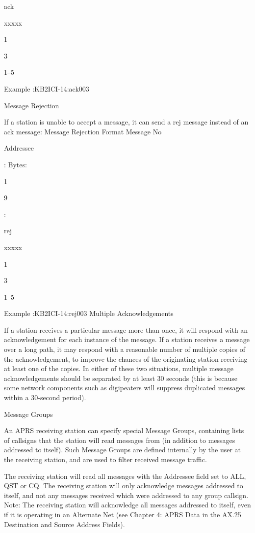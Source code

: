 {{{{ack

xxxxx

1

3

1–5

Example
:KB2ICI-14:ack003

Message Rejection

If a station is unable to accept a message, it can send a rej message instead
of an ack message:
Message Rejection Format
Message
No

Addressee

:
Bytes:

1

9

:

rej

xxxxx

1

3

1–5

Example
:KB2ICI-14:rej003
Multiple
Acknowledgements

If a station receives a particular message more than once, it will respond with
an acknowledgement for each instance of the message.
If a station receives a message over a long path, it may respond with a
reasonable number of multiple copies of the acknowledgement, to improve
the chances of the originating station receiving at least one of the copies.
In either of these two situations, multiple message acknowledgements should
be separated by at least 30 seconds (this is because some network
components such as digipeaters will suppress duplicated messages within a
30-second period).

Message Groups

An APRS receiving station can specify special Message Groups, containing
lists of callsigns that the station will read messages from (in addition to
messages addressed to itself). Such Message Groups are defined internally
by the user at the receiving station, and are used to filter received message
traffic.



The receiving station will read all messages with the Addressee field set to
ALL, QST or CQ.
The receiving station will only acknowledge messages addressed to itself,
and not any messages received which were addressed to any group callsign.
Note: The receiving station will acknowledge all messages addressed to
itself, even if it is operating in an Alternate Net (see Chapter 4: APRS Data
in the AX.25 Destination and Source Address Fields).

}}}}
